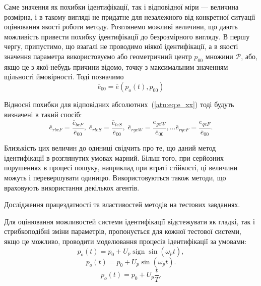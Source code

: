 \documentclass[a4paper,13pt]{atuaref}
\DeclareMathOperator*{\sign}{sign}
\begin{document}
Саме значення як похибки ідентифікації, так і відповідної міри ---
величина розмірна, і в такому вигляді не придатне для незалежного від
конкретної ситуації оцінювання якості роботи методу. Розглянемо можливі
величини, що дають можливість привести похибку ідентифікації до безрозмірного
вигляду. В першу чергу, припустимо, що взагалі не проводимо ніякої
ідентифікації, а в якості значення параметра використовуємо або геометричний
центр $ p_{00} $ множини $ \mathcal{P} $, або, якщо це з якої-небудь причини
відомо, точку з максимальним значенням щільності ймовірності. Тоді позначимо
%
\begin{equation}
  \overline{e}_{00}
  =
  \overline{e}(p_o(t),p_{00})
  \label{atu:eq:e_00}
\end{equation}

Відносні похибки для відповідних абсолютних~(\ref{atu:eq:e_xx})
тоді будуть визначені в такий спосіб:
%
\begin{equation}
  \overline{e}_{rbcF} = \frac{\overline{e}_{bcF}}{\overline{e}_{00}}, \;
  \overline{e}_{rleS} = \frac{\overline{e}_{leS}}{\overline{e}_{00}}, \;
  \overline{e}_{rgeW} = \frac{\overline{e}_{geW}}{\overline{e}_{00}},
  \ldots
  \overline{e}_{rqeF} = \frac{\overline{e}_{qeF}}{\overline{e}_{00}}.
  \label{atu:eq:e_rxx}
\end{equation}

Близькість цих величин до одиниці свідчить про те, що даний метод ідентифікації
в розглянутих умовах марний. Більш того, при серйозних порушеннях в процесі
пошуку, наприклад при втраті стійкості, ці величини можуть і перевершувати
одиницю. Використовуються також методи, що враховують
використання декількох агентів.

Дослідження працездатності та властивостей методів на тестових завданнях.

Для оцінювання можливостей системи ідентифікації відстежувати як гладкі, так і
стрибкоподібні зміни параметрів, пропонується для кожної тестової системи, якщо
це можливо, проводити моделювання процесів ідентифікації за умовами:
%
\begin{equation}
  p_o(t) = p_0 +  U_{p} \sign \sin( \omega_{p} t ),
  \label{atu:eq:po_t_sign}
\end{equation}
%
%
\begin{equation}
  p_o(t) = p_0 +  U_{p} \sin( \omega_{p} t ).
  \label{atu:eq:po_t_sin}
\end{equation}
%
\begin{equation}
  p_o(t) = p_0 +  U_{p} \frac{t}{T}.
  \label{atu:eq:po_t_ramp}
\end{equation}
\end{document}
